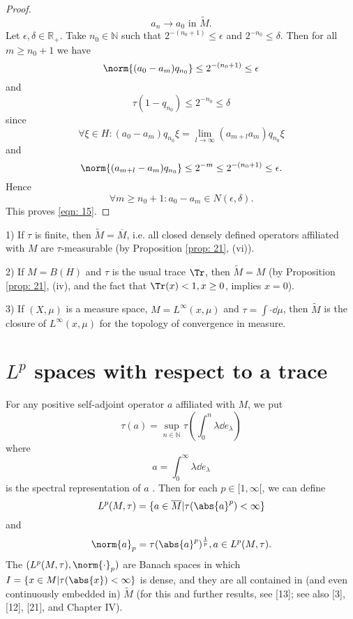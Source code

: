 \begin{proof}
\begin{equation}
    a_n\to a_0 \text{ in }\widetilde{M}.
\end{equation}\label{eqn: 15}
Let $\epsilon,\delta\in \mathbb{R}_+$. Take $n_0\in \mathbb{N}$ such that $2^{-(n_0+1)}\leq \epsilon$ and $2^{-n_0}\leq \delta$. Then for all $m\geq n_0+1$ we have
    \[
      \norm{(a_0-a_m)q_{n_0}}\leq 2^{-(n_0+1)}\leq \epsilon  
    \]
and
\[
    \tau(1-q_{n_0})\leq 2^{-n_0}\leq \delta  
\] 
since
\[
    \forall \xi\in H:(a_0-a_m)q_{n_0}\xi=\lim_{l\to\infty}(a_{m+l}a_m)q_{n_0}\xi  
\]
and
\[
    \norm{(a_{m+l}-a_m)q_{n_0}}\leq 2^{-m}\leq 2^{-(n_0+1)}\leq \epsilon.  
\]
Hence 
\[
  \forall m\geq n_0+1:a_0-a_m\in N(\epsilon,\delta).  
\]
This proves \eqref{eqn: 15}.
\end{proof}
\begin{example}
    1) If $\tau$ is finite, then $\widetilde{M}=\overline{M}$, i.e. all closed densely defined operators affiliated with $M$ are $\tau$-measurable (by Proposition \ref{prop: 21}, (vi)).\par 
    2) If $M=B(H)$ and $\tau$ is the usual trace $\Tr$, then $\widetilde{M}=M$ (by Proposition \ref{prop: 21}, (iv), and the fact that $\Tr(x) < 1, x\geq 0$, implies $x = 0$).\par
    3) If $(X,\mu)$ is a measure space, $M = L^\infty(x,\mu)$ and $\tau=\int\cdot \dd \mu$, then $\widetilde{M}$ is the closure of $L^\infty(x,\mu)$ for the topology of convergence in measure. 
\end{example}
\section{$L^p$ spaces with respect to a trace}
For any positive self-adjoint operator $a$ affiliated with $M$, we put 
\[
    \tau(a)=\sup_{n\in \mathbb{N}}\tau\left( \int_0^n \lambda\dd e_\lambda \right)  
\]
where 
\[
    a=\int_0^\infty \lambda  \dd e_\lambda
\]
is the spectral representation of $a$ . Then for each $p\in [1,\infty[$, we can define 
\[
   L^p(M,\tau)=\{a\in \overline{M}|\tau(\abs{a}^p)<\infty\} 
\]
and 
\[
    \norm{a}_p=\tau(\abs{a}^p)^\frac{1}{p},a\in L^p(M,\tau).
\]
The $(L^p(M,\tau),\norm{\cdot}_p)$ are Banach spaces in which $I=\{x\in M|\tau(\abs{x})<\infty\}$ is dense, and they are all contained in (and even continuously embedded in) $\widetilde{M}$ (for this and further results, see [13]; see also [3], [12], [21], and Chapter IV). 

